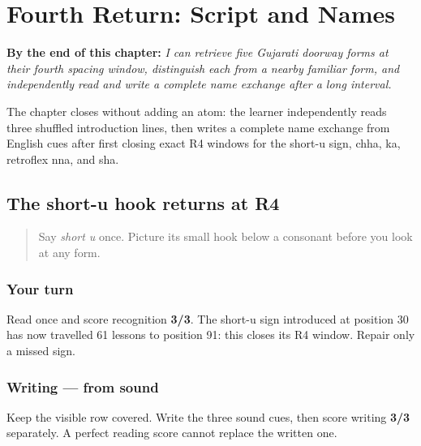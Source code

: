 
\chapter{Fourth Return: Script and Names}
\label{ch:gu-r4-script-names}

\begin{chapteropening}
\textbf{By the end of this chapter:} \emph{I can retrieve five Gujarati doorway forms at their fourth spacing window, distinguish each from a nearby familiar form, and independently read and write a complete name exchange after a long interval.}

The chapter closes without adding an atom: the learner independently reads three shuffled introduction lines, then writes a complete name exchange from English cues after first closing exact R4 windows for the short-u sign, chha, ka, retroflex nna, and sha.
\end{chapteropening}

\section[\texorpdfstring{\gu{ુ} \gu{ી} (short-u sign — long-ii sign)}{ુ ી (short-u sign — long-ii sign)}]{The short-u hook returns at R4}

\label{lesson:GU-R15-u-matra-r4}



\begin{quote}
Say \emph{short u} once. Picture its small hook below a consonant before you look at any form.
\end{quote}

\subsection*{Your turn}
Read \textbf{  } once and score recognition \textbf{3/3}. The short-u sign introduced at position 30 has now travelled 61 lessons to position 91: this closes its R4 window. Repair only a missed sign.

\subsection*{Writing — from sound}
Keep the visible row covered. Write the three sound cues, then score writing \textbf{3/3} separately. A perfect reading score cannot replace the written one.

